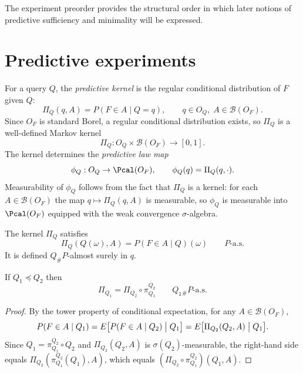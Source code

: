 \begin{remark}
The experiment preorder provides the structural order in which later
notions of predictive sufficiency and minimality will be expressed.
\end{remark}

\bigskip

\section{Predictive experiments}\label{sec:predictive-experiments}

\begin{definition}\label{def:predictive-kernel}
For a query $Q$, the \emph{predictive kernel} is the regular
conditional distribution of $F$ given $Q$:
\[
\Pi_Q(q,A)
=
P(F\in A\mid Q=q),
\qquad
q\in O_Q,\; A\in\mathcal B(O_F).
\]
Since $O_F$ is standard Borel, a regular conditional distribution
exists, so $\Pi_Q$ is a well-defined Markov kernel
\[
\Pi_Q:O_Q\times\mathcal B(O_F)\to[0,1].
\]
The kernel determines the \emph{predictive law map}
\[
\phi_Q:O_Q\to \Pcal(O_F),
\qquad
\phi_Q(q)=\Pi_Q(q,\cdot).
\]
Measurability of $\phi_Q$ follows from the fact that $\Pi_Q$ is a
kernel: for each $A\in\mathcal B(O_F)$ the map $q\mapsto \Pi_Q(q,A)$
is measurable, so $\phi_Q$ is measurable into $\Pcal(O_F)$ equipped
with the weak convergence $\sigma$-algebra.
\end{definition}

\begin{remark}
The kernel $\Pi_Q$ satisfies
\[
\Pi_Q(Q(\omega),A)
=
P(F\in A\mid Q)(\omega)
\qquad \text{$P$-a.s.}
\]
It is defined $Q_\#P$-almost surely in $q$.
\end{remark}

\begin{proposition}\label{prop:pred-compat}
If $Q_1\preceq Q_2$ then
\[
\Pi_{Q_1}
=
\Pi_{Q_2}\circ\pi^{Q_2}_{Q_1}
\qquad Q_1{}_\#P\text{-a.s.}
\]
\end{proposition}

\begin{proof}
By the tower property of conditional expectation,
for any $A\in\mathcal B(O_F)$,
\[
P(F\in A\mid Q_1)
=
E\bigl[P(F\in A\mid Q_2)\bigm| Q_1\bigr]
=
E\bigl[\Pi_{Q_2}(Q_2,A)\bigm| Q_1\bigr].
\]
Since $Q_1=\pi^{Q_2}_{Q_1}\circ Q_2$ and $\Pi_{Q_2}(Q_2,A)$ is
$\sigma(Q_2)$-measurable, the right-hand side equals
$\Pi_{Q_2}(\pi^{Q_2}_{Q_1}(Q_1),A)$,
which equals $(\Pi_{Q_2}\circ\pi^{Q_2}_{Q_1})(Q_1,A)$.
\end{proof}

